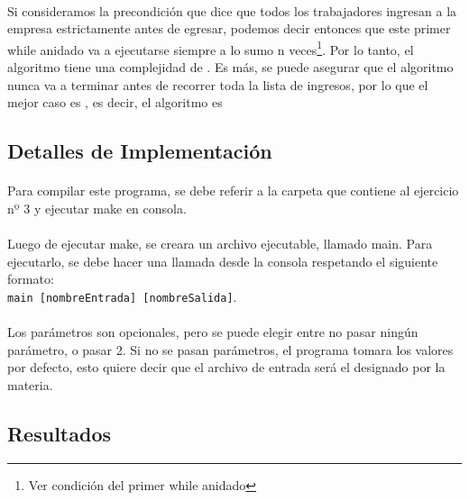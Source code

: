 \paragraph{}
Si consideramos la precondición que dice que todos los trabajadores ingresan a la empresa estrictamente antes de egresar, podemos decir entonces que este primer while anidado va a ejecutarse siempre a lo sumo n veces\footnote{Ver condición del primer while anidado}. Por lo tanto, el algoritmo tiene una complejidad de . Es más, se puede asegurar que el algoritmo nunca va a terminar antes de recorrer toda la lista de ingresos, por lo que el mejor caso es , es decir, el algoritmo es 



\subsection{Detalles de Implementación}

\paragraph{}
Para compilar este programa, se debe referir a la carpeta que contiene al ejercicio nº 3 y ejecutar make en consola.

\paragraph{}
Luego de ejecutar make, se creara un archivo ejecutable, llamado main. Para ejecutarlo, se debe hacer una llamada desde la consola respetando el siguiente formato:\\
\texttt{main [nombreEntrada] [nombreSalida]}.

\paragraph{}
Los parámetros son opcionales, pero se puede elegir entre no pasar ningún parámetro, o pasar 2. Si no se pasan parámetros, el programa tomara los valores por defecto, esto quiere decir que el archivo de entrada será el designado por la materia.


\subsection{Resultados}
\label{resultadosej3}

